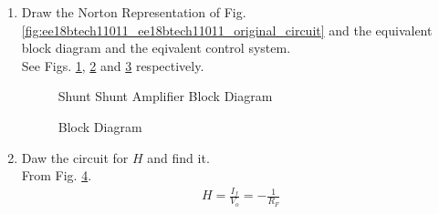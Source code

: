 \begin{enumerate}[label=\arabic*.,ref=\theenumi]
\item Draw the Norton Representation of Fig. \ref{fig:ee18btech11011_ee18btech11011_original_circuit} and the equivalent block diagram and the eqivalent control system.
\\
\solution See Figs. \ref{fig:ee18btech11011_ee18btech11011_Norton_Representation}, \ref{fig:ee18btech11011_Shunt_Shunt_Amplifier_Block_Diagram} and \ref{fig:ee18btech11011_Block Diagram} respectively.
%
\renewcommand{\thefigure}{\theenumi.\arabic{figure}}
\begin{figure}[!ht]
	\begin{center}
			\resizebox{\columnwidth}{!}{}
	\end{center}
\caption{}
\label{fig:ee18btech11011_ee18btech11011_Norton_Representation}
\end{figure}
%
\begin{figure}[!ht]
	\begin{center}
			\resizebox{\columnwidth}{!}{}
	\end{center}
\caption{Shunt Shunt Amplifier Block Diagram}
\label{fig:ee18btech11011_Shunt_Shunt_Amplifier_Block_Diagram}
\end{figure}
\begin{figure}[!ht]
	\begin{center}
			\resizebox{\columnwidth}{!}{}
	\end{center}
\caption{Block Diagram}
\label{fig:ee18btech11011_Block Diagram}
\end{figure}
\renewcommand{\thefigure}{\theenumi}
\item Daw the circuit for $H$ and find it.
\\
\solution From Fig. \ref{fig:ee18btech11011_ee18btech11011_beta_circuit}. 
%
\begin{align}
\label{eq:ee18btech11011_Feedback_Factor}
H = \frac{I_{f}}{V_{o}} = -\frac{1}{R_F}\\
\end{align}
\begin{figure}[!ht]
	\begin{center}
			\resizebox{\columnwidth}{!}{}
	\end{center}
\caption{}
\label{fig:ee18btech11011_ee18btech11011_beta_circuit}

\end{figure}
\end{enumerate}
